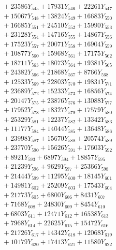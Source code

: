 \documentclass[a4paper,10pt]{article}
\begin{document}
{\begin{align}
&\;  + 23586 Y_{545} + 17931 Y_{546} + 22261 Y_{547} \\[0.3ex]
&\;  + 15067 Y_{548} + 13824 Y_{549} + 16683 Y_{550} \\[0.3ex]
&\;  + 16685 Y_{551} + 24510 Y_{552} + 15990 Y_{553} \\[0.3ex]
&\;  + 23128 Y_{554} + 14716 Y_{555} + 14867 Y_{556} \\[0.3ex]
&\;  + 17523 Y_{557} + 20071 Y_{558} + 16904 Y_{559} \\[0.3ex]
&\;  + 10877 Y_{560} + 15968 Y_{561} + 17175 Y_{562} \\[0.3ex]
&\;  + 18711 Y_{563} + 18073 Y_{564} + 19381 Y_{565} \\[0.3ex]
&\;  + 24382 Y_{566} + 21868 Y_{567} + 8766 Y_{568} \\[0.5ex]\allowbreak
&\;  + 12533 Y_{569} + 22803 Y_{570} + 19831 Y_{571} \\[0.3ex]
&\;  + 23689 Y_{572} + 15233 Y_{573} + 16856 Y_{574} \\[0.3ex]
&\;  + 20147 Y_{575} + 23876 Y_{576} + 13088 Y_{577} \\[0.3ex]
&\;  + 17952 Y_{578} + 18327 Y_{579} + 17579 Y_{580} \\[0.3ex]
&\;  + 25329 Y_{581} + 12237 Y_{582} + 13342 Y_{583} \\[0.3ex]
&\;  + 11177 Y_{584} + 14044 Y_{585} + 13648 Y_{586} \\[0.3ex]
&\;  + 23998 Y_{587} + 15670 Y_{588} + 20574 Y_{589} \\[0.3ex]
&\;  + 23770 Y_{590} + 15626 Y_{591} + 17603 Y_{592} \\[0.3ex]
&\;  + 8921 Y_{593} + 6897 Y_{594} + 18857 Y_{595} \\[0.3ex]
&\;  + 21239 Y_{596} + 9629 Y_{597} + 25366 Y_{598} \\[0.5ex]\allowbreak
&\;  + 21444 Y_{599} + 11295 Y_{600} + 18145 Y_{601} \\[0.3ex]
&\;  + 14981 Y_{602} + 25209 Y_{603} + 17543 Y_{604} \\[0.3ex]
&\;  + 21773 Y_{605} + 6800 Y_{606} + 8431 Y_{607} \\[0.3ex]
&\;  + 7168 Y_{608} + 24830 Y_{609} + 8454 Y_{610} \\[0.3ex]
&\;  + 6803 Y_{611} + 12471 Y_{612} + 16538 Y_{613} \\[0.3ex]
&\;  + 7968 Y_{614} + 22625 Y_{615} + 15472 Y_{616} \\[0.3ex]
&\;  + 21726 Y_{617} + 14342 Y_{618} + 12068 Y_{619} \\[0.3ex]
&\;  + 10179 Y_{620} + 17413 Y_{621} + 11580 Y_{622} \\[0.3ex]

\end{align}}
\end{document}
